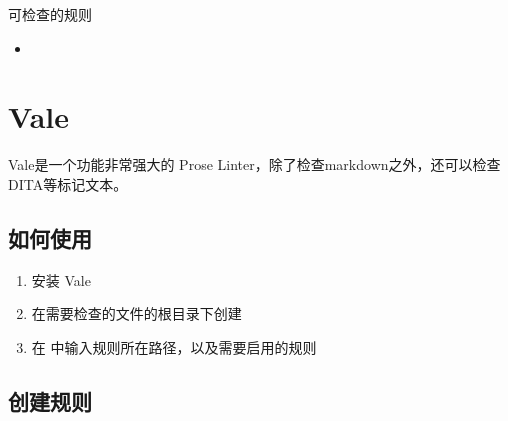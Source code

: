 \documentclass[letterpaper,10pt,english]{sphinxmanual}
\begin{document}
\sphinxAtStartPar
可检查的规则
\begin{itemize}
\item {} 
\sphinxAtStartPar
{}

\end{itemize}

\sphinxstepscope


\chapter{Vale}
\label{\detokenize{doc-quality/Vale:vale}}\label{\detokenize{doc-quality/Vale::doc}}
\sphinxAtStartPar
Vale是一个功能非常强大的 Prose Linter，除了检查markdown之外，还可以检查DITA等标记文本。


\section{如何使用}
\label{\detokenize{doc-quality/Vale:id1}}\begin{enumerate}
%
\item {} 
\sphinxAtStartPar
安装 Vale 

\item {} 
\sphinxAtStartPar
在需要检查的文件的根目录下创建 

\item {} 
\sphinxAtStartPar
在   中输入规则所在路径，以及需要启用的规则

\begin{sphinxVerbatim}[commandchars=\\\{\}]
  
  

\PYG{p}{[}\PYG{p}{]}
  
  
  
\end{sphinxVerbatim}

\end{enumerate}


\section{创建规则}
\label{\detokenize{doc-quality/Vale:id2}}
\end{document}
